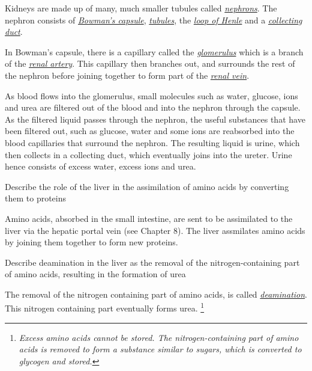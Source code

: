 Kidneys are made up of many, much smaller tubules called \ul{\emph{nephrons}}. The
nephron consists of \ul{\emph{Bowman's capsule}}, \ul{\emph{tubules}}, the
\ul{\emph{loop of Henle}} and a \ul{\emph{collecting duct}}. 

\smallskip
In Bowman's capsule, there is a capillary called the \ul{\emph{glomerulus}} which is
a branch of the \ul{\emph{renal artery}}. This
capillary then branches out, and surrounds the rest of the nephron before joining together to
form part of the \ul{\emph{renal vein}}.

As blood flows into the glomerulus, small molecules such as water, glucose, ions and urea are 
filtered out of the blood and into the nephron through the capsule. As the filtered liquid passes
through the nephron, the useful substances that have been filtered out, such as glucose, water and
some ions are reabsorbed into the blood capillaries that surround the nephron. The resulting
liquid is urine, which then collects in a collecting duct, which eventually joins into the ureter.
Urine hence consists of excess water, excess ions and urea.

\begin{point}
Describe the role of the liver in the assimilation of amino acids by converting them to proteins
\end{point}

Amino acids, absorbed in the small intestine, are sent to be assimilated to the liver via the
hepatic portal vein (see Chapter 8). The liver assmilates amino acids by joining them together to
form new proteins.

\begin{point}
Describe deamination in the liver as the removal of the nitrogen-containing part of amino acids, resulting 
in the formation of urea
\end{point}
The removal of the nitrogen containing part of amino acids, is called 
\ul{\emph{deamination}}. This nitrogen containing part eventually forms urea.
\footnote{\emph{Excess amino acids cannot be stored. The nitrogen-containing part of amino acids is removed to
form a substance similar to sugars, which is converted to glycogen and stored.}}
